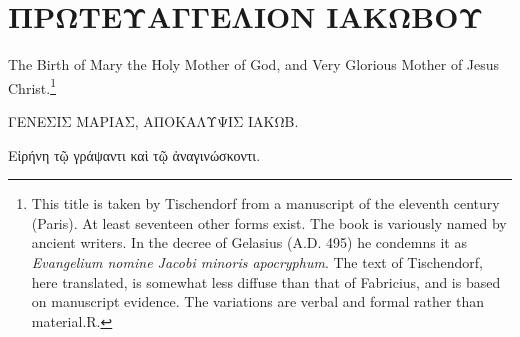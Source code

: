 \documentclass[12pt]{book} %
\begin{document}
\chapter*{{\greekfont ΠΡΩΤΕΥΑΓΓΕΛΙΟΝ ΙΑΚΩΒΟΥ}}

The Birth of Mary the Holy Mother of God, and Very Glorious Mother of Jesus Christ.\footnote{This title is taken by Tischendorf from a manuscript of the eleventh century (Paris). At least seventeen other forms exist. The book is variously named by ancient writers. In the decree of Gelasius (A.D. 495) he condemns it as \textit{Evangelium nomine Jacobi minoris apocryphum}. The text of Tischendorf, here translated, is somewhat less diffuse than that of Fabricius, and is based on manuscript evidence. The variations are verbal and formal rather than material.\textemdash R.}

\begin{pairs}
\begin{Leftside}\beginnumbering
{\greekfont


}

\endnumbering\end{Leftside}
\begin{Rightside}\beginnumbering


\endnumbering\end{Rightside}
\end{pairs}
\Columns

{\greekfont
ΓΕΝΕΣΙΣ ΜΑΡΙΑΣ, ΑΠΟΚΑΛΥΨΙΣ ΙΑΚΩΒ.

Εἰρήνη τῷ γράψαντι καὶ τῷ ἀναγινώσκοντι.

}
\end{document}
